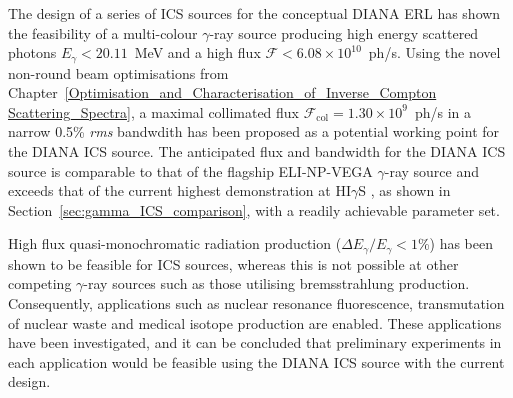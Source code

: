 \documentclass[../main.tex]{subfiles}
\begin{document}
The design of a series of ICS sources for the conceptual DIANA ERL has shown the feasibility of a multi-colour $\gamma$-ray source producing high energy scattered photons $E_{\gamma}<20.11$~\si{\mega\electronvolt} and a high flux $\mathcal{F}<6.08\times 10^{10}$~ph/\si{\second}. Using the novel non-round beam optimisations from Chapter~\ref{Optimisation_and_Characterisation_of_Inverse_Compton Scattering_Spectra}, a maximal collimated flux $\mathcal{F}_{\mathrm{col}}=1.30\times 10^{9}$~ph/\si{\second} in a narrow 0.5\% \textit{rms} bandwdith has been proposed as a potential working point for the DIANA ICS source. The anticipated flux and bandwidth for the DIANA ICS source is comparable to that of the flagship ELI-NP-VEGA \cite{elinp2019vega,tanaka2020current} $\gamma$-ray source and exceeds that of the current highest demonstration at HI$\gamma$S \cite{weller2009research}, as shown in Section~\ref{sec:gamma_ICS_comparison}, with a readily achievable parameter set.

High flux quasi-monochromatic radiation production ($\Delta E_{\gamma}/E_{\gamma} < 1$\%) has been shown to be feasible for ICS sources, whereas this is not possible at other competing $\gamma$-ray sources such as those utilising bremsstrahlung production. Consequently, applications such as nuclear resonance fluorescence, transmutation of nuclear waste and medical isotope production are enabled. These applications have been investigated, and it can be concluded that preliminary experiments in each application would be feasible using the DIANA ICS source with the current design.
\end{document}
